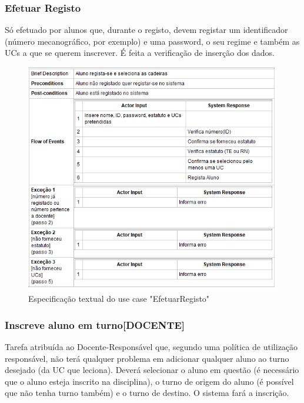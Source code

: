 \documentclass[a4paper]{article}
\begin{document}
\clearpage
\subsubsection{Efetuar Registo}
\hspace{3mm}Só efetuado por alunos que, durante o registo, devem registar um identificador (número mecanográfico, por exemplo) e uma password, o seu regime e também as UCs a que se querem inscrever. É feita a verificação de inserção dos dados.

\begin{figure}[H]
\centering
\includegraphics[width=14cm]{UCEfetuarRegisto}
\caption{Especificação textual do use case "EfetuarRegisto"}
\label{}
\end{figure}

\clearpage
\subsubsection{Inscreve aluno em turno[DOCENTE]}
\hspace{3mm}Tarefa atribuída ao Docente-Responsável que, segundo uma política de utilização responsável, não terá qualquer problema em adicionar qualquer aluno ao turno desejado (da UC que leciona). Deverá selecionar o aluno em questão (é necessário que o aluno esteja inscrito na disciplina), o turno de origem do aluno (é possível que não tenha turno também) e o turno de destino. O sistema fará a inscrição.
\end{document}
